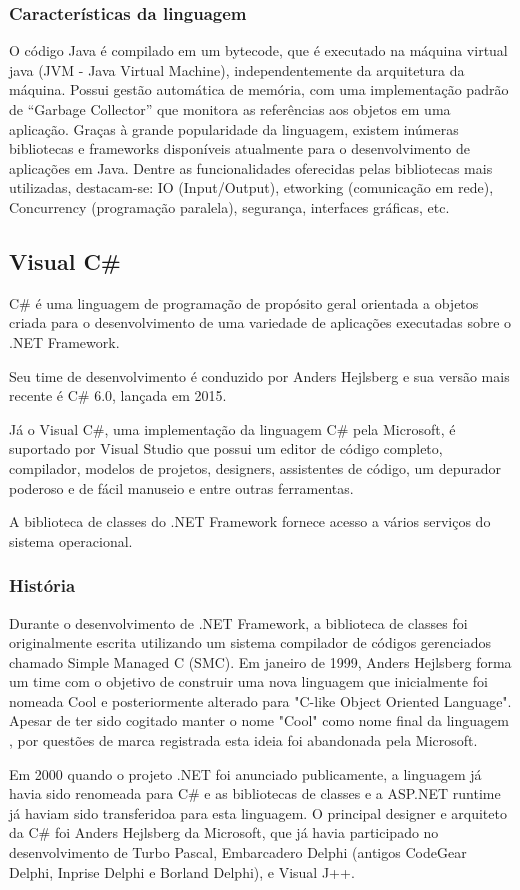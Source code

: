 	\subsubsection{Características da linguagem}\label{subsubsec-caractjava}
	O código Java é compilado em um bytecode, que é executado na máquina virtual java (JVM - Java Virtual Machine), independentemente da arquitetura da máquina.
	Possui gestão automática de memória, com uma implementação padrão de “Garbage Collector” que monitora as referências aos objetos em uma aplicação.
	Graças à grande popularidade da linguagem, existem inúmeras bibliotecas e frameworks disponíveis atualmente para o desenvolvimento de aplicações em Java. Dentre
	as funcionalidades oferecidas pelas bibliotecas mais utilizadas, destacam-se: IO (Input/Output), etworking (comunicação em rede), Concurrency (programação paralela),
	segurança, interfaces gráficas, etc.
	
	\subsection{Visual C\#}\label{subsec-csharp}
	 C\# é uma linguagem de programação de propósito geral orientada a objetos criada para o desenvolvimento de uma variedade de aplicações executadas sobre o .NET Framework.\par
	Seu time de desenvolvimento é conduzido por Anders Hejlsberg e sua versão mais recente é C\# 6.0, lançada em 2015.\par
	Já o Visual C\#, uma implementação da linguagem C\# pela Microsoft, é suportado por Visual Studio que possui um editor de código completo, compilador, modelos de projetos, designers, assistentes de código, um depurador poderoso e de fácil manuseio e entre outras ferramentas. \par
	A biblioteca de classes do .NET Framework fornece acesso a vários serviços do sistema operacional.\par
	\subsubsection{História}\label{subsubsec-histcsharp}
	

	Durante o desenvolvimento de .NET Framework, a biblioteca de classes foi originalmente escrita utilizando um sistema compilador de códigos gerenciados chamado Simple Managed C (SMC). Em janeiro de 1999, Anders Hejlsberg forma um time com o objetivo de construir uma nova linguagem que inicialmente foi nomeada Cool e posteriormente alterado para "C-like Object Oriented Language". Apesar de ter sido cogitado manter o nome "Cool" como nome final da linguagem , por questões de marca registrada esta ideia foi abandonada pela  Microsoft.\par
	Em 2000 quando o projeto .NET foi anunciado publicamente, a linguagem já havia sido renomeada para C\# e as bibliotecas de classes e a ASP.NET runtime  já haviam sido transferidoa para esta linguagem. O principal designer e arquiteto da C\# foi Anders Hejlsberg da Microsoft, que já havia participado no desenvolvimento de Turbo Pascal, Embarcadero Delphi (antigos CodeGear Delphi, Inprise Delphi e Borland Delphi), e Visual J++. \par\cite{visualc}
